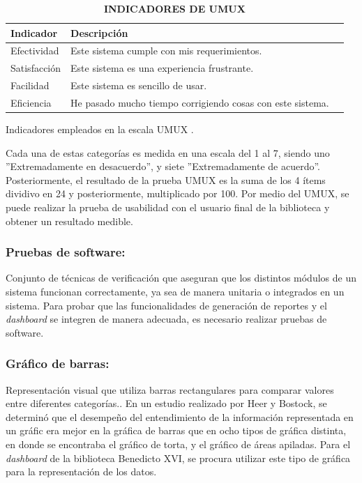 \documentclass[spanish]{ieee_upb}
\begin{document}
\begin{table}[htpb]
    \centering
    \caption[Indicadores de UMUX]{\bfseries INDICADORES DE UMUX}
    \label{tab:evaluacion_sistema}
    \begin{tabular}{lll} \hline
        \textbf{Indicador} & \textbf{Descripción} \\ \hline
        Efectividad  & Este sistema cumple con mis requerimientos. \\
        Satisfacción & Este sistema es una experiencia frustrante. \\ 
        Facilidad    & Este sistema es sencillo de usar. \\ 
        Eficiencia   & He pasado mucho tiempo corrigiendo cosas con este sistema. \\ \hline
    \end{tabular}
    \vspace{2mm}
    \newline
    \small{Indicadores empleados en la escala UMUX \cite{finstad2010usabilityUMUX}.}
\end{table}



Cada una de estas categorías es medida en una escala del 1 al 7, siendo uno ''Extremadamente en desacuerdo'', y siete ''Extremadamente de acuerdo''. Posteriormente, el resultado de la prueba UMUX es la suma de los 4 ítems dividivo en 24 y posteriormente, multiplicado por 100\cite{finstad2010usabilityUMUX}. Por medio del UMUX, se puede realizar la prueba de usabilidad con el usuario final de la biblioteca y obtener un resultado medible.

  \subsubsection{Pruebas de software: } Conjunto de técnicas de verificación que aseguran que los distintos módulos de un sistema funcionan correctamente, ya sea de manera unitaria o integrados en un sistema\cite{jorgensen2013software}. Para probar que las funcionalidades de generación de reportes y el \textit{dashboard} se integren de manera adecuada, es necesario realizar pruebas de software.

  \subsubsection{Gráfico de barras: } Representación visual que utiliza barras rectangulares para comparar valores entre diferentes categorías.\cite{healy2018data}. En un estudio realizado por Heer y Bostock\cite{heer2010crowdsourcingESTUDIOGRAFICAS}, se determinó que el desempeño del entendimiento de la información representada en un gráfic era mejor en la gráfica de barras que en ocho tipos de gráfica distinta, en donde se encontraba el gráfico de torta, y el gráfico de áreas apiladas. Para el \textit{dashboard} de la biblioteca Benedicto XVI, se procura utilizar este tipo de gráfica para la representación de los datos.
\end{document}
